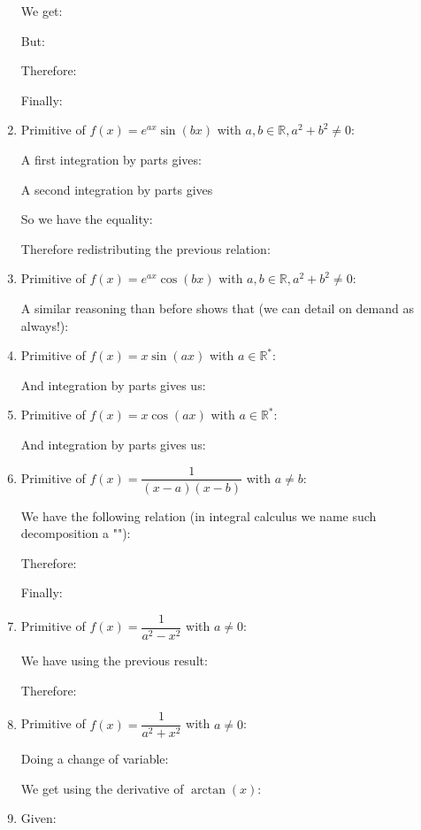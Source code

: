 \begin{enumerate}
		We get:
		
		But:
		
		Therefore:
		
		Finally:
		
		
		\item Primitive of $f(x)=e^{ax}\sin(bx)$ with $a,b\in \mathbb{R},a^2+b^2\neq 0$:
		
		A first integration by parts gives:
		
		A second integration by parts gives
		
		So we have the equality:
		
		Therefore redistributing the previous relation:
		
		
		\item Primitive of $f(x)=e^{ax}\cos(bx)$ with $a,b\in \mathbb{R},a^2+b^2\neq 0$:
		
		A similar reasoning than before shows that (we can detail on demand as always!):
		
		
		\item Primitive of $f(x)=x\sin(ax)$ with $a \in \mathbb{R}^*$:
		
		And integration by parts gives us:
		
		
		\item Primitive of $f(x)=x\cos(ax)$ with $a \in \mathbb{R}^*$:
		
		And integration by parts gives us:
		
		
		\item Primitive of $f(x)=\dfrac{1}{(x-a)(x-b)}$ with $a \neq b$:
		
		We have the following relation (in integral calculus we name such decomposition a ""):
		
		Therefore:
		
		
		Finally:
		
		
		\item Primitive of $f(x)=\dfrac{1}{a^2-x^2}$ with $a \neq 0$:
		
		We have using the previous result:	
		
		Therefore:
		

		\item Primitive of $f(x)=\dfrac{1}{a^2+x^2}$ with $a \neq 0$:
		
		Doing a change of variable:
		
		We get using the derivative of $\arctan (x)$:
		
		
		\item Given:
		

\end{enumerate}
